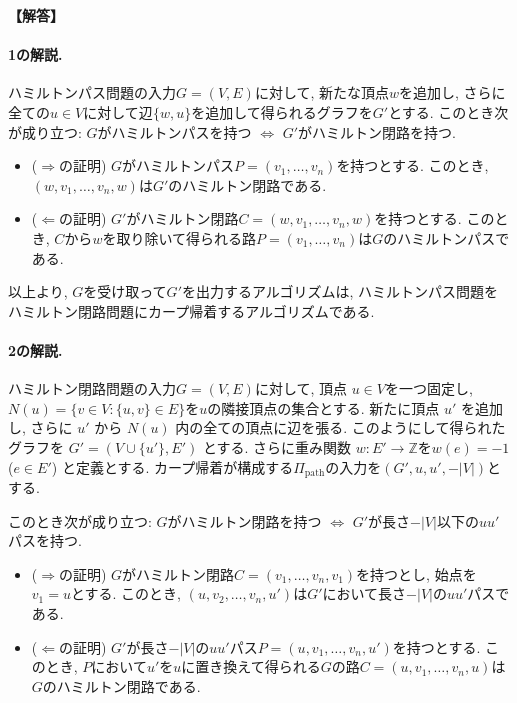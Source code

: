 \documentclass[12pt,a4paper]{article}
\newenvironment{solution}{
    \vspace{0.5em}
    \begin{tcolorbox}[colback=white, colframe=black, boxrule=1pt, arc=0mm, breakable]
    \noindent
    \textbf{【解答】}
    \vspace{0.3em}
}{
    \end{tcolorbox}
    \vspace{1em}
}
\begin{document}
\begin{solution}
\paragraph*{1の解説.}

ハミルトンパス問題の入力$G=(V,E)$に対して, 新たな頂点$w$を追加し, さらに全ての$u\in V$に対して辺$\{w,u\}$を追加して得られるグラフを$G'$とする. このとき次が成り立つ: $G$がハミルトンパスを持つ $\iff$ $G'$がハミルトン閉路を持つ.

\begin{itemize}
\item ($\Rightarrow$の証明) $G$がハミルトンパス$P=(v_1,\dots,v_n)$を持つとする. このとき, $(w,v_1,\dots,v_n,w)$は$G'$のハミルトン閉路である.
\item ($\Leftarrow$の証明) $G'$がハミルトン閉路$C=(w,v_1,\dots,v_n,w)$を持つとする. このとき, $C$から$w$を取り除いて得られる路$P=(v_1,\dots,v_n)$は$G$のハミルトンパスである.
\end{itemize}

以上より, $G$を受け取って$G'$を出力するアルゴリズムは, ハミルトンパス問題をハミルトン閉路問題にカープ帰着するアルゴリズムである.

\paragraph*{2の解説.}

ハミルトン閉路問題の入力$G=(V,E)$に対して, 頂点 $u\in V$を一つ固定し, $N(u)=\{v\in V\colon \{u,v\}\in E\}$を$u$の隣接頂点の集合とする.
新たに頂点 $u'$ を追加し, さらに $u'$ から $N(u)$ 内の全ての頂点に辺を張る. このようにして得られたグラフを $G'=(V\cup\{u'\},E')$ とする.
さらに重み関数 $w\colon E' \to \mathbb{Z}$を$w(e)=-1$ ($e\in E'$) と定義とする.
カープ帰着が構成する$\Pi_{\mathrm{path}}$の入力を$(G',u,u',-|V|)$とする.

このとき次が成り立つ: $G$がハミルトン閉路を持つ $\iff$ $G'$が長さ$-|V|$以下の$uu'$パスを持つ.

\begin{itemize}
\item ($\Rightarrow$の証明) $G$がハミルトン閉路$C=(v_1,\dots,v_n,v_1)$を持つとし, 始点を$v_1=u$とする. このとき, $(u,v_2,\dots,v_n,u')$は$G'$において長さ$-|V|$の$uu'$パスである.
\item ($\Leftarrow$の証明) $G'$が長さ$-|V|$の$uu'$パス$P=(u,v_1,\dots,v_n,u')$を持つとする. このとき, $P$において$u'$を$u$に置き換えて得られる$G$の路$C=(u,v_1,\dots,v_n,u)$は$G$のハミルトン閉路である.
\end{itemize}

\end{solution}
\end{document}

